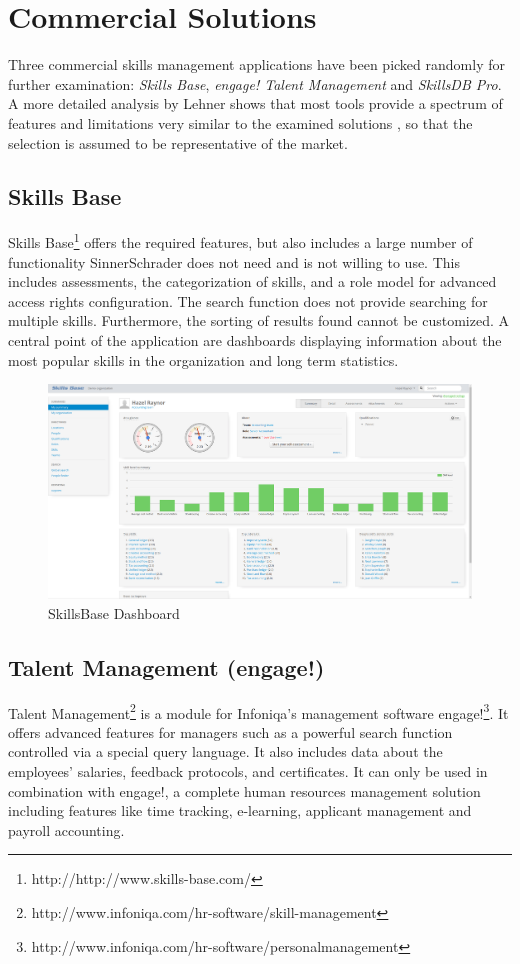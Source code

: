 \section{Commercial Solutions}
\label{commercial}
Three commercial skills management applications have been picked randomly for further examination: \textit{Skills Base}, \textit{engage! Talent Management} and \textit{SkillsDB Pro}.
A more detailed analysis by Lehner shows that most tools provide a spectrum of features and limitations very similar to the examined solutions \cite{Marktanalyse}, so that the selection is assumed to be representative of the market.

\subsection{Skills Base}
Skills Base\footnote{http://http://www.skills-base.com/} offers the required features, but also includes a large number of functionality SinnerSchrader does not need and is not willing to use. This includes assessments, the categorization of skills, and a role model for advanced access rights configuration.
The search function does not provide searching for multiple skills. Furthermore, the sorting of results found cannot be customized. A central point of the application are dashboards displaying information about the most popular skills in the organization and long term statistics.
\begin{figure}[!htp]
    \centering
    \includegraphics[width=\textwidth]{images/skillsbase-dashboard.png}
    \caption[Screenshot: SkillsBase Dashboard]{SkillsBase Dashboard}
    \label{fig:skillsbase_dashboard}
\end{figure}

\subsection{Talent Management (engage!)}
Talent Management\footnote{http://www.infoniqa.com/hr-software/skill-management} is a module for Infoniqa’s management software engage!\footnote{http://www.infoniqa.com/hr-software/personalmanagement}. It offers advanced features for managers such as a powerful search function controlled via a special query language. It also includes data about the employees’ salaries, feedback protocols, and certificates. It can only be used in combination with engage!, a complete human resources management solution including features like time tracking, e-learning, applicant management and payroll accounting.

